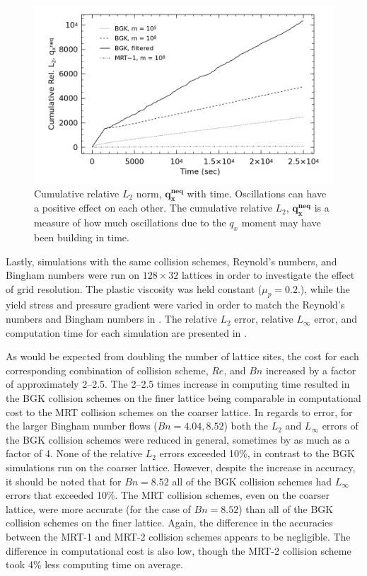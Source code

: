 \begin{figure}
    \includegraphics[width=\linewidth]{figs/poise-bingham/qx_cumulative}
    \caption{Cumulative relative $L_2$ norm, $\mathbf{q_x^{neq}}$ with time. Oscillations can have a positive effect on each other. The cumulative relative $L_2$, $\mathbf{q_x^{neq}}$ is a measure of how much oscillations due to the $q_x$ moment may have been building in time.}
    \label{fig:qx-cumulative}
\end{figure}

Lastly, simulations with the same collision schemes, Reynold's numbers, and Bingham numbers were run on $128 \times 32$ lattices in order to investigate the effect of grid resolution.
The plastic viscosity was held constant ($\mu_p = 0.2$.), while the yield stress and pressure gradient were varied in order to match the Reynold's numbers and Bingham numbers in .
The relative $L_2$ error, relative $L_{\infty}$ error, and computation time for each simulation are presented in .

As would be expected from doubling the number of lattice sites, the cost for each corresponding combination of collision scheme, $Re$, and $Bn$ increased by a factor of approximately 2--2.5.
The 2--2.5 times increase in computing time resulted in the BGK collision schemes on the finer lattice being comparable in computational cost to the MRT collision schemes on the coarser lattice.
In regards to error, for the larger Bingham number flows ($Bn = 4.04, 8.52$) both the $L_2$ and $L_\infty$ errors of the BGK collision schemes were reduced in general, sometimes by as much as a factor of 4.
None of the relative $L_2$ errors exceeded 10\%, in contrast to the BGK simulations run on the coarser lattice.
However, despite the increase in accuracy, it should be noted that for $Bn = 8.52$ all of the BGK collision schemes had $L_\infty$ errors that exceeded 10\%.
The MRT collision schemes, even on the coarser lattice, were more accurate (for the case of $Bn = 8.52$) than all of the BGK collision schemes on the finer lattice.
Again, the difference in the accuracies between the MRT-1 and MRT-2 collision schemes appears to be negligible.
The difference in computational cost is also low, though the MRT-2 collision scheme took 4\% less computing time on average.

